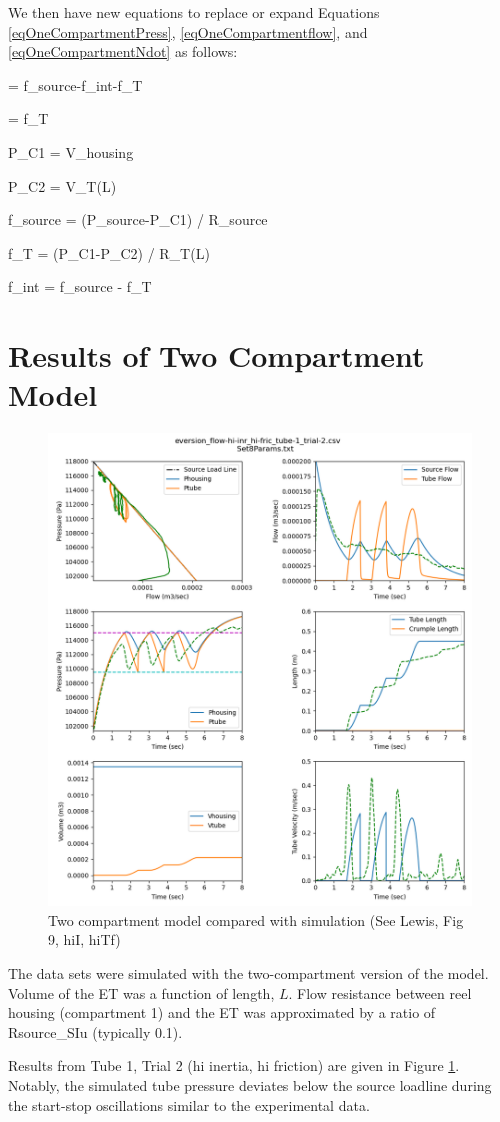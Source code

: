 \documentclass[letterpaper]{article}
\begin{document}
We then have new equations to replace or expand Equations \ref{eqOneCompartmentPress}, \ref{eqOneCompartmentflow}, and \ref{eqOneCompartmentNdot}
as follows:

\beq
{} = f_{source}-f_{int}-f_T
\eeq

\beq
{} =  f_T
\eeq

\beq
P_{C1} =   {V_{housing}}
\eeq

\beq
P_{C2} =   {V_T(L)}
\eeq

\beq
f_{source} = (P_{source}-P_{C1}) /  R_{source}
\eeq

\beq
f_{T} = (P_{C1}-P_{C2}) /  R_{T}(L)
\eeq

\beq
f_{int} = f_{source} - f_T
\eeq

\section{Results of Two Compartment Model}

\begin{figure}[h]\centering
\includegraphics[width=.75\textwidth]{2CompSimulationSet8.png}
\caption{Two compartment model compared with simulation (See Lewis, Fig 9, hiI, hiTf)}
\label{Fig:2Comp}
\end{figure}


The data sets were simulated with the two-compartment version of the model.  Volume of the ET was
a function of length, $L$.  Flow resistance between reel housing (compartment 1) and
the ET was approximated by a ratio of Rsource\_SIu (typically 0.1).

Results from Tube 1, Trial 2 (hi inertia, hi friction) are given in Figure \ref{Fig:2Comp}.
Notably, the simulated tube pressure deviates below the source loadline during the start-stop
oscillations similar to the experimental data.

\end{document}
